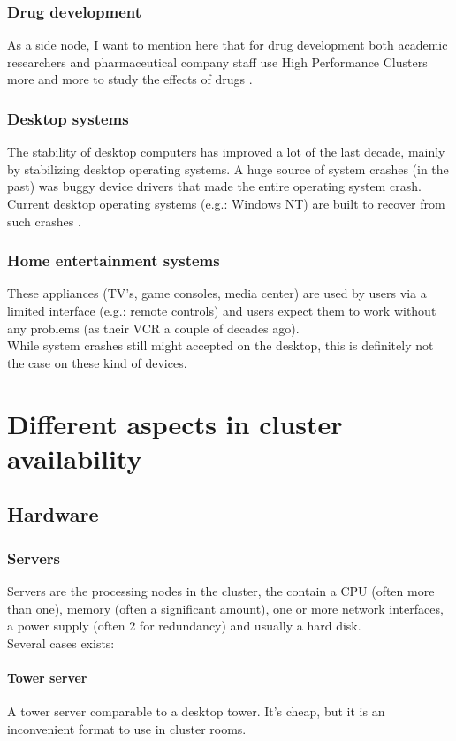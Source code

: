 \documentclass[12pt]{report}
\begin{document}
\subsection{Drug development}
As a side node, I want to mention here that for drug development both
academic researchers and pharmaceutical company staff use High
Performance Clusters more and more to study the effects of drugs
\cite{deforche2007bayesian} \cite{lengauer2006bioinformatics}.

\subsection{Desktop systems}
The stability of desktop computers has improved a lot of the last decade,
mainly by stabilizing desktop operating systems. A huge source of system
crashes (in the past) was buggy device drivers that made the entire
operating system crash.
Current desktop operating systems
(e.g.: Windows NT) are built to recover from such crashes
\cite{windows_nt_kernel}.

\subsection{Home entertainment systems}
These appliances (TV's, game consoles, media center) are used by users via a limited interface (e.g.:
remote controls) and users expect them to work without any problems
(as their VCR a  couple of decades ago).\\
While system crashes still might accepted on the desktop, this is
definitely not the case on these kind of devices. 


\chapter{Different aspects in cluster availability}
\label{chap:aspects}
\section{Hardware}
\subsection{Servers}
Servers are the processing nodes in the cluster, the contain a CPU
(often more than one), memory (often a significant amount), one or
more network interfaces, a power supply (often 2 for redundancy) and
usually a hard disk.\\
Several cases exists:
\subsubsection{Tower server} 
A tower server comparable to a desktop tower. It's cheap, but it is
  an inconvenient format to use in cluster rooms.
\end{document}
